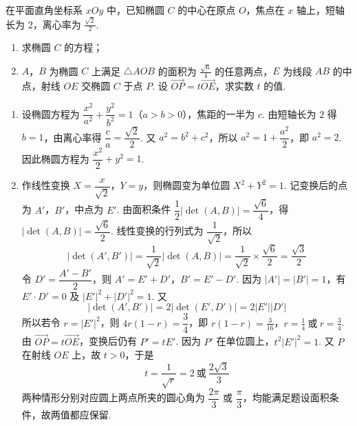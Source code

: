 \begin{problem}
在平面直角坐标系 \(xOy\) 中，已知椭圆 \(C\) 的中心在原点 \(O\)，焦点在 \(x\) 轴上，短轴长为 2，离心率为 \(\frac{\sqrt{2}}{2}\).

\begin{enumerate}
\item 求椭圆 \(C\) 的方程；
\item \(A\)，\(B\) 为椭圆 \(C\) 上满足 \(\triangle AOB\) 的面积为 \(\frac{\sqrt{6}}{4}\) 的任意两点，\(E\) 为线段 \(AB\) 的中点，射线 \(OE\) 交椭圆 \(C\) 于点 \(P\). 设 \(\overrightarrow{OP} = t\overrightarrow{OE}\)，求实数 \(t\) 的值.
\end{enumerate}
\end{problem}

\begin{solution}
\begin{enumerate}
\item 设椭圆方程为 \(\dfrac{x^2}{a^2}+\dfrac{y^2}{b^2}=1\)（\(a>b>0\)），焦距的一半为 \(c\). 由短轴长为 \(2\) 得 \(b=1\)，由离心率得 \(\dfrac{c}{a}=\dfrac{\sqrt2}{2}\). 又 \(a^2=b^2+c^2\)，所以 \(a^2=1+\dfrac{a^2}{2}\)，即 \(a^2=2\). 因此椭圆方程为 \(\dfrac{x^2}{2}+y^2=1\).
\item 作线性变换 \(X=\dfrac{x}{\sqrt2}\)，\(Y=y\)，则椭圆变为单位圆 \(X^2+Y^2=1\). 记变换后的点为 \(A'\)，\(B'\)，中点为 \(E'\). 由面积条件 \(\dfrac12\left|\det(A,B)\right|=\dfrac{\sqrt6}{4}\)，得 \(\left|\det(A,B)\right|=\dfrac{\sqrt6}{2}\). 线性变换的行列式为 \(\dfrac{1}{\sqrt2}\)，所以
\[
\left|\det(A',B')\right|=\frac{1}{\sqrt2}\left|\det(A,B)\right|=\frac{1}{\sqrt2}\times\frac{\sqrt6}{2}=\frac{\sqrt3}{2}
\]
令 \(D'=\dfrac{A'-B'}{2}\)，则 \(A'=E'+D'\)，\(B'=E'-D'\). 因为 \(|A'|=|B'|=1\)，有 \(E'\cdot D'=0\) 及 \(|E'|^2+|D'|^2=1\). 又
\[
\left|\det(A',B')\right|=2\left|\det(E',D')\right|=2|E'||D'|
\]
所以若令 \(r=|E'|^2\)，则 \(4r(1-r)=\dfrac34\)，即
\(r(1-r)=\frac{3}{16}\)，\(r=\frac14\ \text{或}\ r=\frac34\).
由 \(\overrightarrow{OP}=t\overrightarrow{OE}\)，变换后仍有 \(P'=tE'\). 因为 \(P'\) 在单位圆上，\(t^2|E'|^2=1\). 又 \(P\) 在射线 \(OE\) 上，故 \(t>0\)，于是
\[
t=\frac{1}{\sqrt r}=2\ \text{或}\ \frac{2\sqrt3}{3}
\]
两种情形分别对应圆上两点所夹的圆心角为 \(\dfrac{2\pi}{3}\) 或 \(\dfrac{\pi}{3}\)，均能满足题设面积条件，故两值都应保留.
\end{enumerate}
\end{solution}

